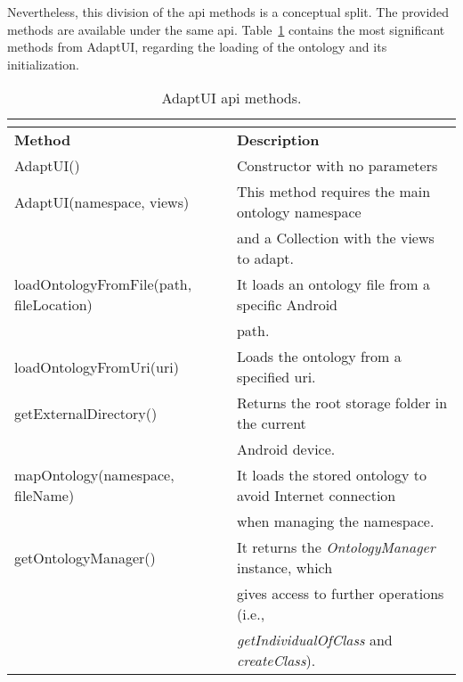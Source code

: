 \inputminted[linenos=true, fontsize=\footnotesize, frame=lines]{java}{4_system_architecture/api_knowledge.java}

Nevertheless, this division of the \ac{api} methods is a conceptual split. The
provided methods are available under the same \ac{api}. Table~\ref{tbl:api} 
contains the most significant methods from AdaptUI, regarding the loading of the 
ontology and its initialization.

\begin{center}
\footnotesize
\begin{longtable}{l l}
  \caption{AdaptUI \ac{api} methods.}\\
  \label{tbl:api} \\
  \hline 
  \textbf{Method}				& \textbf{Description}\\
  \hline
  AdaptUI()					& Constructor with no parameters			\\
  AdaptUI(namespace, views)			& This method requires the main ontology namespace	\\
						& and a Collection with the views to adapt.		\\
  loadOntologyFromFile(path, fileLocation)	& It loads an ontology file from a specific Android	\\
						& path.							\\
  loadOntologyFromUri(uri)			& Loads the ontology from a specified \ac{uri}.		\\
  getExternalDirectory()			& Returns the root storage folder in the current	\\
						& Android device.					\\
  mapOntology(namespace, fileName)		& It loads the stored ontology to avoid Internet connection\\
						& when managing the namespace.				\\
  getOntologyManager()				& It returns the \textit{OntologyManager} instance, which\\
						& gives access to further operations (i.e., 		\\
						& \textit{getIndividualOfClass} and \textit{createClass}).\\
  \hline
\end{longtable}
\end{center}


